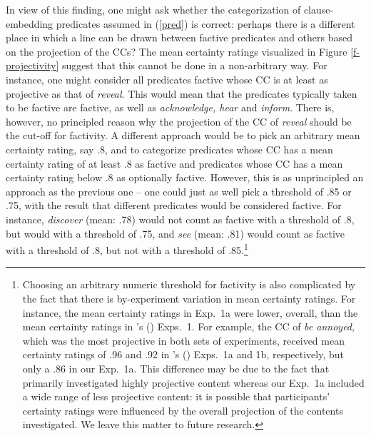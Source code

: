 \documentclass[11pt,fleqn]{article}
\newcommand{\6}{\mbox{$[\hspace*{-.6mm}[$}}
\newcommand{\9}{\mbox{$]\hspace*{-.6mm}]$}}
\newcommand{\citetpos}[1]{\citeauthor{#1}'s (\citeyear{#1})}
\begin{document}
In view of this finding, one might ask whether the categorization of clause-embedding predicates assumed in (\ref{pred}) is correct: perhaps there is a different place in which a line can be drawn between factive predicates and others based on the projection of the CCs? The mean certainty ratings visualized in Figure \ref{f-projectivity} suggest that this cannot be done in a non-arbitrary way. For instance, one might consider all predicates factive whose CC is at least as projective as that of {\em reveal}. This would mean that the predicates typically taken to be factive are factive, as well as {\em acknowledge, hear} and {\em inform}. There is, however, no principled reason why the projection of the CC of {\em reveal} should be the cut-off for factivity. A different approach would be to pick an arbitrary mean certainty rating, say .8, and to categorize predicates whose CC has a mean certainty rating of at least .8 as factive and predicates whose CC has a mean certainty rating below .8 as optionally factive. However, this is as unprincipled an approach as the previous one -- one could just as well pick a threshold of .85 or .75, with the result that different predicates would be considered factive. For instance, {\em discover} (mean: .78) would not count as factive with a threshold of .8, but would with a threshold of .75, and {\em see} (mean: .81) would count as factive with a threshold of .8, but not with a threshold of .85.\footnote{Choosing an arbitrary numeric threshold for factivity is also complicated by the fact that there is by-experiment variation in mean certainty ratings. For instance, the mean certainty ratings in Exp.~1a were lower, overall, than the mean certainty ratings in \citetpos{tbd-variability} Exps.~1. For example, the CC of {\em be annoyed}, which was the most projective in both sets of experiments, received mean certainty ratings of .96  and .92 in \citetpos{tbd-variability} Exps.~1a and 1b, respectively, but only a .86 in our Exp.~1a. This difference may be due to the fact that \citet{tbd-variability} primarily investigated highly projective content whereas our Exp.~1a included a wide range of less projective content: it is possible that participants' certainty ratings were influenced by the overall projection of the contents investigated. We leave this matter to future research.}
\end{document}
